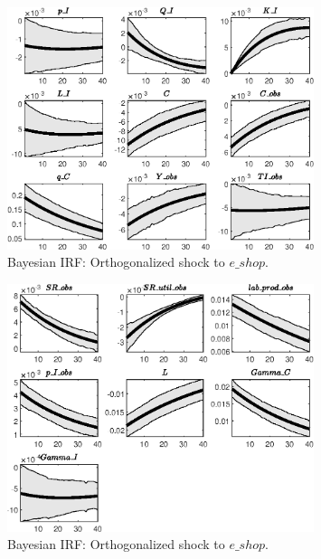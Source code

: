 \begin{figure}[H]
\centering 
\includegraphics[width=0.80\textwidth]{directed_search/Output/directed_search_Bayesian_IRF_e_shop_1}
\caption{Bayesian IRF: Orthogonalized shock to $e\_shop$.}
\label{Fig:BayesianIRF:e_shop:1}
\end{figure}
 
\begin{figure}[H]
\centering 
\includegraphics[width=0.80\textwidth]{directed_search/Output/directed_search_Bayesian_IRF_e_shop_2}
\caption{Bayesian IRF: Orthogonalized shock to $e\_shop$.}
\label{Fig:BayesianIRF:e_shop:2}
\end{figure}
 
